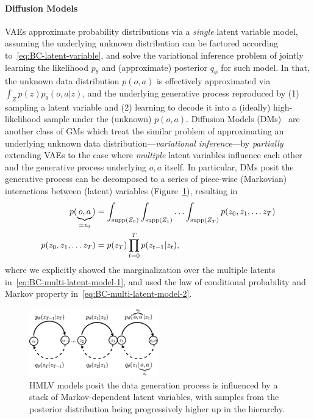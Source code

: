 \paragraph{Diffusion Models}
VAEs approximate probability distributions via a \emph{single} latent variable model, assuming the underlying unknown distribution can be factored according to~\ref{eq:BC-latent-variable}, and solve the variational inference problem of jointly learning the likelihood \( p_\theta \) and (approximate) posterior \( q_\phi \) for such model.
In that, the unknown data distribution \( p(o,a) \) is effectively approximated via \( \int_Z p(z) p_\theta(o,a \vert z) \), and the underlying generative process reproduced by (1) sampling a latent variable and (2) learning to decode it into a (ideally) high-likelihood sample under the (unknown) \( p(o,a) \).
Diffusion Models (DMs)~\citep{hoDenoisingDiffusionProbabilistic2020} are another class of GMs which treat the similar problem of approximating an underlying unknown data distribution---\emph{variational inference}---by \emph{partially} extending VAEs to the case where \emph{multiple} latent variables influence each other and the generative process underlying \(o,a\) itself.
In particular, DMs posit the generative process can be decomposed to a series of piece-wise (Markovian) interactions between (latent) variables (Figure~\ref{fig:ch4-many-latents}), resulting in
\begin{align}
    p(\underbrace{o,a}_{= z_0}) &= \int_{\text{supp}({Z_0})} \int_{\text{supp}({Z_1})} \hdots \int_{\text{supp}({Z_T})} p(z_0, z_1, \dots z_T) \label{eq:BC-multi-latent-model-1} \\ 
    p(z_0, z_1, \dots z_T) &= p(z_T) \prod_{t=0}^{T} p(z_{t-1} \vert z_t), \label{eq:BC-multi-latent-model-2}
\end{align}
where we explicitly showed the marginalization over the multiple latents in~\ref{eq:BC-multi-latent-model-1}, and used the law of conditional probability and Markov property in~\ref{eq:BC-multi-latent-model-2}.

\begin{figure}
    \centering
    \includegraphics[width=0.5\textwidth]{figures/ch4/ch4-many-latents.png}
    \caption{HMLV models posit the data generation process is influenced by a stack of Markov-dependent latent variables, with samples from the posterior distribution being progressively higher up in the hierarchy.}
    \label{fig:ch4-many-latents}
\end{figure}

